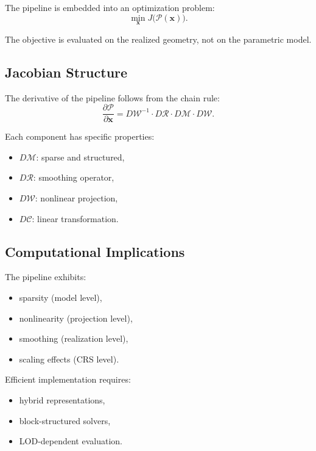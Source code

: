 The pipeline is embedded into an optimization problem:
\[
\min_{\mathbf{x}}
J\bigl(\mathcal{P}(\mathbf{x})\bigr).
\]

The objective is evaluated on the realized geometry, not on the
parametric model.


\subsection{Jacobian Structure}

The derivative of the pipeline follows from the chain rule:
\[
\frac{\partial \mathcal{P}}{\partial \mathbf{x}}
=
D\mathcal{W}^{-1}
\cdot
D\mathcal{R}
\cdot
D\mathcal{M}
\cdot
D\mathcal{W}.
\]

Each component has specific properties:
\begin{itemize}
\item \(D\mathcal{M}\): sparse and structured,
\item \(D\mathcal{R}\): smoothing operator,
\item \(D\mathcal{W}\): nonlinear projection,
\item \(D\mathcal{C}\): linear transformation.
\end{itemize}


\subsection{Computational Implications}

The pipeline exhibits:
\begin{itemize}
\item sparsity (model level),
\item nonlinearity (projection level),
\item smoothing (realization level),
\item scaling effects (CRS level).
\end{itemize}

Efficient implementation requires:
\begin{itemize}
\item hybrid representations,
\item block-structured solvers,
\item LOD-dependent evaluation.
\end{itemize}


